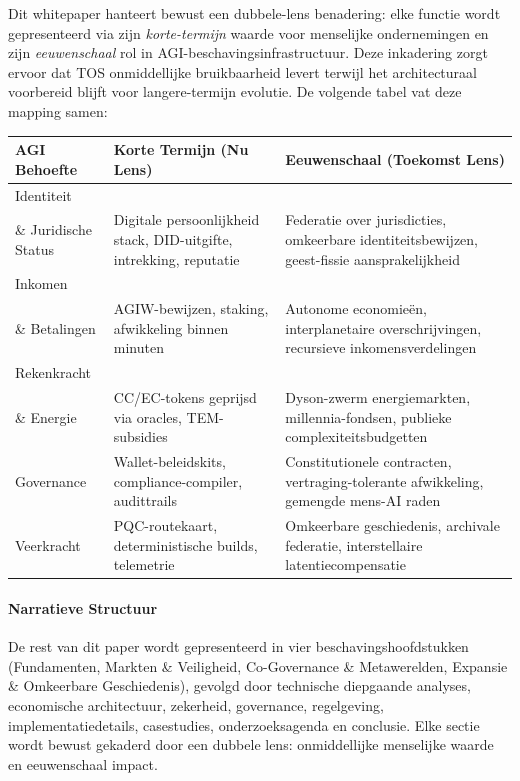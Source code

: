 \documentclass[11pt]{article}
\begin{document}
Dit whitepaper hanteert bewust een dubbele-lens benadering: elke functie wordt gepresenteerd via zijn \emph{korte-termijn} waarde voor menselijke ondernemingen en zijn \emph{eeuwenschaal} rol in AGI-beschavingsinfrastructuur. Deze inkadering zorgt ervoor dat TOS onmiddellijke bruikbaarheid levert terwijl het architecturaal voorbereid blijft voor langere-termijn evolutie. De volgende tabel vat deze mapping samen:

\begin{longtable}{@{}p{}p{}p{}@{}}
\toprule
\textbf{AGI Behoefte} & \textbf{Korte Termijn (Nu Lens)} & \textbf{Eeuwenschaal (Toekomst Lens)} \\\midrule
Identiteit \\ \& Juridische Status & Digitale persoonlijkheid stack, DID-uitgifte, intrekking, reputatie & Federatie over jurisdicties, omkeerbare identiteitsbewijzen, geest-fissie aansprakelijkheid \\
Inkomen \\ \& Betalingen & AGIW-bewijzen, staking, afwikkeling binnen minuten & Autonome economieën, interplanetaire overschrijvingen, recursieve inkomensverdelingen \\
Rekenkracht \\ \& Energie & CC/EC-tokens geprijsd via oracles, TEM-subsidies & Dyson-zwerm energiemarkten, millennia-fondsen, publieke complexiteitsbudgetten \\
Governance & Wallet-beleidskits, compliance-compiler, audittrails & Constitutionele contracten, vertraging-tolerante afwikkeling, gemengde mens-AI raden \\
Veerkracht & PQC-routekaart, deterministische builds, telemetrie & Omkeerbare geschiedenis, archivale federatie, interstellaire latentiecompensatie \\\bottomrule
\end{longtable}

\paragraph{Narratieve Structuur} De rest van dit paper wordt gepresenteerd in vier beschavingshoofdstukken (Fundamenten, Markten \& Veiligheid, Co-Governance \& Metawerelden, Expansie \& Omkeerbare Geschiedenis), gevolgd door technische diepgaande analyses, economische architectuur, zekerheid, governance, regelgeving, implementatiedetails, casestudies, onderzoeksagenda en conclusie. Elke sectie wordt bewust gekaderd door een dubbele lens: onmiddellijke menselijke waarde en eeuwenschaal impact.
\end{document}
